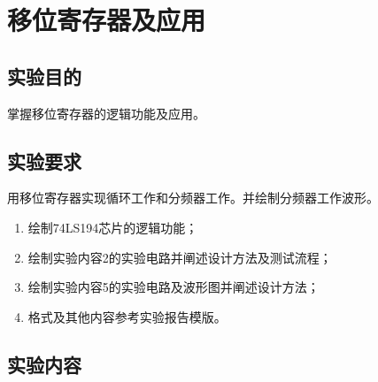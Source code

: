 \documentclass{ctexrep}
\begin{document}
\chapter{移位寄存器及应用}%
\label{cha:移位寄存器及应用}

\section{实验目的}%
\label{sec:实验目的}

掌握移位寄存器的逻辑功能及应用。

\section{实验要求}%
\label{sec:实验要求}

用移位寄存器实现循环工作和分频器工作。并绘制分频器工作波形。

\begin{enumerate}
	\item 绘制74LS194芯片的逻辑功能；
	\item 绘制实验内容2的实验电路并阐述设计方法及测试流程；
	\item 绘制实验内容5的实验电路及波形图并阐述设计方法；
	\item 格式及其他内容参考实验报告模版。
\end{enumerate}

\section{实验内容}%
\label{sec:实验内容}
\end{document}
